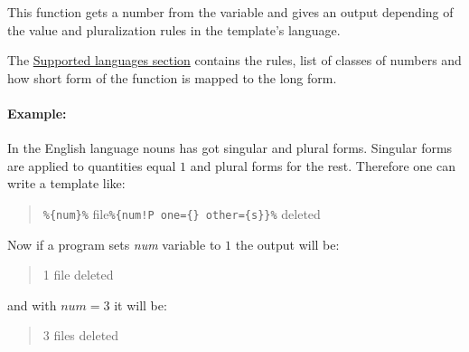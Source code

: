 This function gets a number from the variable and gives an output depending of the value and pluralization rules in the template's language.

The \hyperref[supLangs]{Supported languages section} contains the rules, list of classes of numbers and how short form of the function is mapped to the long form.

\paragraph{Example:} In the English language nouns has got singular and plural forms. Singular forms are applied to quantities equal $1$ and plural forms for the rest.
Therefore one can write a template like:
\begin{quote}
	\verb+%{num}%+ file\verb+%{num!P one={} other={s}}%+ deleted
\end{quote}
Now if a program sets \textit{num} variable to $1$ the output will be:
\begin{quote}
	1 file deleted
\end{quote}
and with $num=3$ it will be:
\begin{quote}
	3 files deleted
\end{quote}
